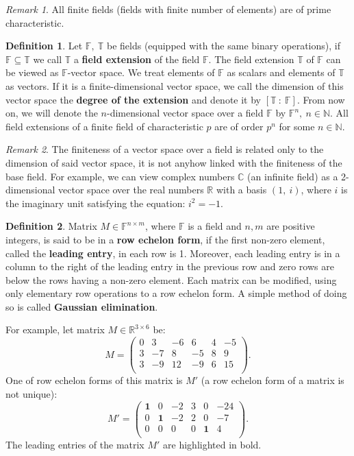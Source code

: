 \documentclass[thesis=M,english]{FITthesis}[2012/10/20]
\theoremstyle{remark}
\newtheorem*{RM}{Remark}
\theoremstyle{definition}
\newtheorem{DF}{Definition}[section]
\begin{document}
\begin{RM}
All finite fields (fields with finite number of elements) are of prime characteristic. 
\end{RM}

\begin{DF}
Let $\mathbb{F},\ \mathbb{T}$ be fields (equipped with the same binary operations), if $\mathbb{F} \subseteq \mathbb{T}$ we call $\mathbb{T}$ a \textbf{field extension} of the field $\mathbb{F}$. The field extension $\mathbb{T}$ of $\mathbb{F}$ can be viewed as $\mathbb{F}$-vector space. We treat elements of $\mathbb{F}$ as scalars and elements of $\mathbb{T}$ as vectors. If it is a finite-dimensional vector space, we call the dimension of this vector space the \textbf{degree of the extension} and denote it by $[\mathbb{T}\ :\ \mathbb{F}]$. From now on, we will denote the $n$-dimensional vector space over a field $\mathbb{F}$ by $\mathbb{F}^n,\ n \in \mathbb{N}$. All field extensions of a finite field of characteristic $p$ are of order $p^n$ for some $n \in \mathbb{N}$. 
\end{DF}
\begin{RM}
The finiteness of a vector space over a field is related only to the dimension of said vector space, it is not anyhow linked with the finiteness of the base field. For example, we can view complex numbers $\mathbb{C}$ (an infinite field) as a 2-dimensional vector space over the real numbers $\mathbb{R}$ with a basis $(1,\ \mathit{i})$, where $\mathit{i}$ is the imaginary unit satisfying the equation: $\mathit{i}^2 = -1.$
\end{RM}
\begin{DF}\label{rowEch}
Matrix $M\in \mathbb{F}^{n\times m}$, where $\mathbb{F}$ is a field and $n,m$ are positive integers, is said to be in a \textbf{row echelon form}, if the first non-zero element, called the \textbf{leading entry}, in each row is 1. Moreover, each leading entry is in a column to the right of the leading entry in the previous row and zero rows are below the rows having a non-zero element. Each matrix can be modified, using only elementary row operations to a row echelon form. A simple method of doing so is called \textbf{Gaussian elimination}. 
\end{DF}
\noindent For example, let matrix $M \in \mathbb{R}^{3\times6}$ be:
$$
M = \begin{pmatrix}
0 & 3 & - 6 &6 & 4 & - 5 \\
3 & -7 & 8 &-5 & 8 & 9 \\
3 & -9 & 12 &-9 & 6 & 15 \\
\end{pmatrix}.
$$
One of row echelon forms of this matrix is $M'$ (a row echelon form of a matrix is not unique):
$$
M' = \begin{pmatrix}
\mathbf{1} & 0 & -2 &3 & 0 & -24 \\
0 & \mathbf{1} & -2 & 2 & 0 & -7 \\
0 & 0 & 0 &0 & \mathbf{1} & 4 \\
\end{pmatrix}.
$$
The leading entries of the matrix $M'$ are highlighted in bold.
\end{document}
